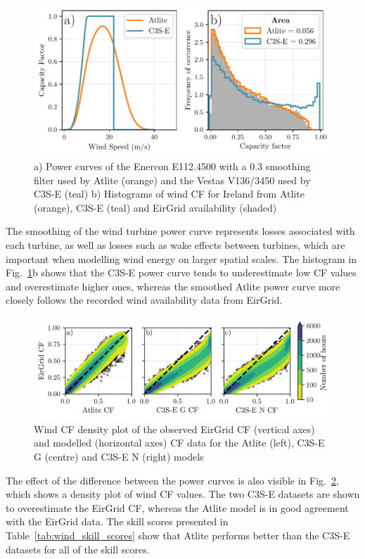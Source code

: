\documentclass[a4paper, 11p1t]{article}
\begin{document}
\begin{figure}[!ht]
	\centering
	\includegraphics{verification_power_curve.pdf}
	\caption{a) Power curves of the Enercon E112.4500 with a 0.3 smoothing filter used by Atlite (orange) and the Vestas V136/3450 used by C3S-E (teal) b) Histograms of wind CF for Ireland from Atlite (orange), C3S-E (teal) and EirGrid availability (shaded)}
	\label{fig:power_curve}
\end{figure}

The smoothing of the wind turbine power curve represents losses associated with each turbine, as well as losses such as wake effects between turbines, which are important when modelling wind energy on larger spatial scales. The histogram in Fig.~\ref{fig:power_curve}b shows that the C3S-E power curve tends to underestimate low CF values and overestimate higher ones, whereas the smoothed Atlite power curve more closely follows the recorded wind availability data from EirGrid.

\begin{figure}[!ht]
	\centering
	\includegraphics{verification_wind_contour.png}
	\caption{Wind CF density plot of the observed EirGrid CF (vertical axes) and modelled (horizontal axes) CF data for the Atlite  (left), C3S-E G (centre) and C3S-E N (right) models}
	\label{fig:wind_verification_contour}
\end{figure}

The effect of the difference between the power curves is also visible in Fig.~\ref{fig:wind_verification_contour}, which shows a density plot of wind CF values. The two C3S-E datasets are shown to overestimate the EirGrid CF, whereas the Atlite model is in good agreement with the EirGrid data. The skill scores presented in Table~\ref{tab:wind_skill_scores} show that Atlite performs better than the C3S-E datasets for all of the skill scores. 
\end{document}
